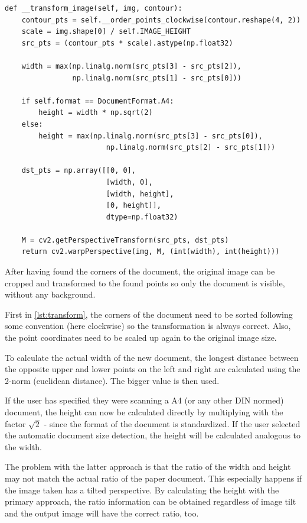 \begin{lstlisting}[caption={Image transformation method}, label={lst:transform}, float]
def __transform_image(self, img, contour):
    contour_pts = self.__order_points_clockwise(contour.reshape(4, 2))
    scale = img.shape[0] / self.IMAGE_HEIGHT
    src_pts = (contour_pts * scale).astype(np.float32)

    width = max(np.linalg.norm(src_pts[3] - src_pts[2]),
                np.linalg.norm(src_pts[1] - src_pts[0]))

    if self.format == DocumentFormat.A4:
        height = width * np.sqrt(2)
    else:
        height = max(np.linalg.norm(src_pts[3] - src_pts[0]),
                        np.linalg.norm(src_pts[2] - src_pts[1]))

    dst_pts = np.array([[0, 0],
                        [width, 0],
                        [width, height],
                        [0, height]],
                        dtype=np.float32)

    M = cv2.getPerspectiveTransform(src_pts, dst_pts)
    return cv2.warpPerspective(img, M, (int(width), int(height)))
\end{lstlisting}

After having found the corners of the document, the original image can be cropped and transformed to the found points so only the document is visible, without any background.

First in \autoref{lst:transform}, the corners of the document need to be sorted following some convention (here clockwise) so the transformation is always correct. Also, the point coordinates need to be scaled up again to the original image size.

To calculate the actual width of the new document, the longest distance between the opposite upper and lower points on the left and right are calculated using the 2-norm (euclidean distance). The bigger value is then used.

If the user has specified they were scanning a A4 (or any other DIN normed) document, the height can now be calculated directly by multiplying with the factor $\sqrt{2}$ - since the format of the document is standardized. If the user selected the automatic document size detection, the height will be calculated analogous to the width.

The problem with the latter approach is that the ratio of the width and height may not match the actual ratio of the paper document. This especially happens if the image taken has a tilted perspective. By calculating the height with the primary approach, the ratio information can be obtained regardless of image tilt and the output image will have the correct ratio, too.

